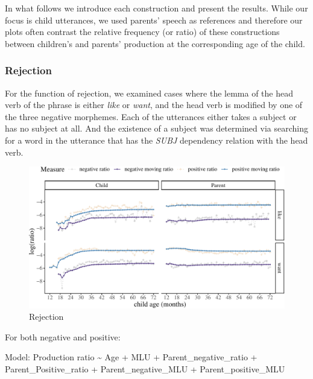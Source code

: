 \documentclass[
  english,
  man,floatsintext]{apa6}
\begin{document}
In what follows we introduce each construction and present the results. While our focus is child utterances, we used parents' speech as references and therefore our plots often contrast the relative frequency (or ratio) of these constructions between children's and parents' production at the corresponding age of the child.

\hypertarget{rejection}{%
\subsubsection{Rejection}\label{rejection}}

For the function of rejection, we examined cases where the lemma of the head verb of the phrase is either \emph{like} or \emph{want}, and the head verb is modified by one of the three negative morphemes. Each of the utterances either takes a subject or has no subject at all. And the existence of a subject was determined via searching for a word in the utterance that has the \emph{SUBJ} dependency relation with the head verb.

\begin{figure}[H]

{\centering \includegraphics{results_files/figure-latex/emotion-1} 

}

\caption{Rejection}\label{fig:emotion}
\end{figure}

For both negative and positive:

Model: Production ratio \textasciitilde{} Age + MLU + Parent\_negative\_ratio + Parent\_Positive\_ratio + Parent\_negative\_MLU + Parent\_positive\_MLU
\end{document}
